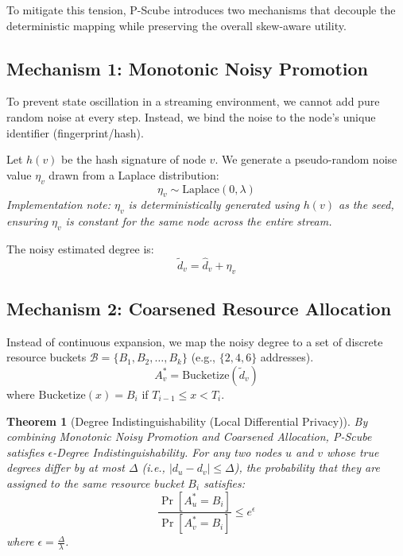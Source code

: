 \documentclass[11pt,a4paper]{article}
\newtheorem{theorem}{Theorem}
\begin{document}
To mitigate this tension, P-Scube introduces two mechanisms that decouple the deterministic mapping while preserving the overall skew-aware utility.

\subsection{Mechanism 1: Monotonic Noisy Promotion}
To prevent state oscillation in a streaming environment, we cannot add pure random noise at every step. Instead, we bind the noise to the node's unique identifier (fingerprint/hash).

Let $h(v)$ be the hash signature of node $v$. We generate a pseudo-random noise value $\eta_v$ drawn from a Laplace distribution:
\begin{equation}
    \eta_v \sim \text{Laplace}\left(0, \lambda \right)
\end{equation}
\textit{Implementation note: $\eta_v$ is deterministically generated using $h(v)$ as the seed, ensuring $\eta_v$ is constant for the same node across the entire stream.}

The noisy estimated degree is:
\begin{equation}
    \tilde{d}_v = \hat{d}_v + \eta_v
\end{equation}

\subsection{Mechanism 2: Coarsened Resource Allocation}
Instead of continuous expansion, we map the noisy degree to a set of discrete resource buckets $\mathcal{B} = \{B_1, B_2, \dots, B_k\}$ (e.g., $\{2, 4, 6\}$ addresses).
\begin{equation}
    A_v^* = \text{Bucketize}(\tilde{d}_v)
\end{equation}
where $\text{Bucketize}(x) = B_i$ if $T_{i-1} \le x < T_i$.

\begin{theorem}[Degree Indistinguishability (Local Differential Privacy)]
By combining Monotonic Noisy Promotion and Coarsened Allocation, P-Scube satisfies $\epsilon$-Degree Indistinguishability. 
For any two nodes $u$ and $v$ whose true degrees differ by at most $\Delta$ (i.e., $|d_u - d_v| \le \Delta$), the probability that they are assigned to the same resource bucket $B_i$ satisfies:
\begin{equation}
    \frac{\Pr[A_u^* = B_i]}{\Pr[A_v^* = B_i]} \le e^{\epsilon}
\end{equation}
where $\epsilon = \frac{\Delta}{\lambda}$.
\end{theorem}
\end{document}
